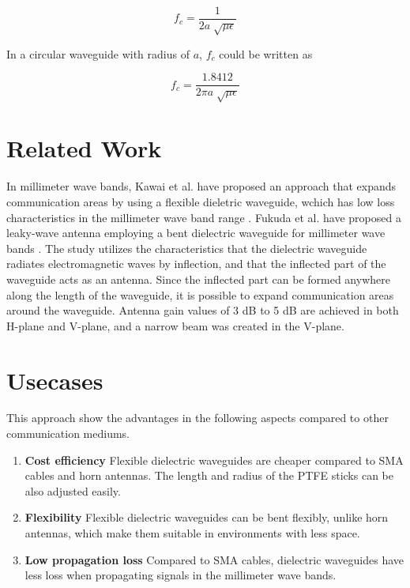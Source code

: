 \documentclass[a4paper,12pt]{report}
\begin{document}
\begin{equation}
  f_c = \frac{1}{2a\sqrt[]{\mu\epsilon}}
\end{equation}

In a circular waveguide with radius of $a$,
$f_c$ could be written as

\begin{equation}
  f_c = \frac{1.8412}{2\pi a\sqrt[]{\mu\epsilon}}
\end{equation}

\section{Related Work}

In millimeter wave bands, Kawai et al. have proposed an approach that expands
communication areas by using a flexible dieletric waveguide,
wchich has low loss characteristics in the millimeter wave band range \cite{new_area_formation_approach}.
Fukuda et al. have proposed a leaky-wave antenna employing a bent dielectric waveguide for
millimeter wave bands \cite{leaky_wave_antenna_bent_dielectric}.
The study utilizes the characteristics that the
dielectric waveguide radiates electromagnetic waves by
inflection, and that the inflected part of the waveguide acts as
an antenna.
Since
the inflected part can be formed anywhere along the length of
the waveguide, it is possible to expand communication areas
around the waveguide. 
Antenna gain values of 3 dB to 5 dB are
achieved in both H-plane and V-plane,
and a narrow beam was created in the V-plane.

\section{Usecases}

This approach show the advantages in the following aspects compared to
other communication mediums.

\begin{enumerate}
  \item \textbf{Cost efficiency} Flexible
  dielectric waveguides are cheaper compared to SMA cables and horn antennas.
  The length and radius of the PTFE sticks can be also adjusted easily.
  \item \textbf{Flexibility} Flexible dielectric waveguides can be bent
  flexibly, unlike horn antennas, which make them suitable in environments
  with less space.
  \item \textbf{Low propagation loss} Compared to SMA cables, dielectric waveguides
  have less loss when propagating signals in the millimeter wave bands.
\end{enumerate}
\end{document}
